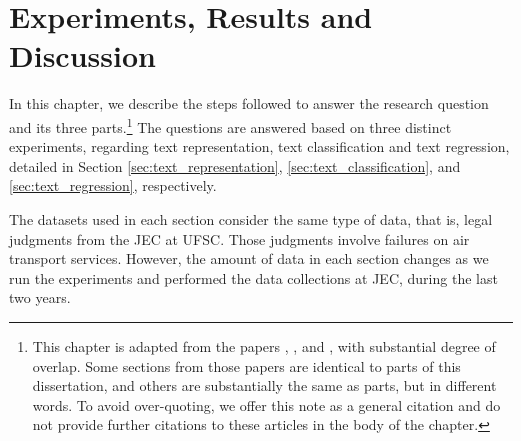 \chapter{Experiments, Results and Discussion} \label{cap:proposal}


In this chapter, we describe the steps followed to answer the research question and its three parts.\footnote{This chapter is adapted from the papers \textcite{Sabo2019},  \textcite{DalPont2020}, and \textcite{Sabo2021}, with substantial degree of overlap.
Some sections from those papers are identical to parts of this dissertation, and others are substantially the same as parts, but in different words. To avoid over-quoting, we offer this note as a general citation and do not provide further citations to these articles in the body of the chapter.}
%
The questions are answered based on three distinct experiments, regarding text representation, text classification and text regression, detailed in Section \ref{sec:text_representation}, \ref{sec:text_classification}, and \ref{sec:text_regression}, respectively. 

The datasets used in each section consider the same type of data, that is, legal judgments from the \gls{JEC} at \gls{UFSC}. Those judgments involve failures on air transport services. However, the amount of data in each section changes as we run the experiments and performed the data collections at \gls{JEC}, during the last two years.

% 

%







